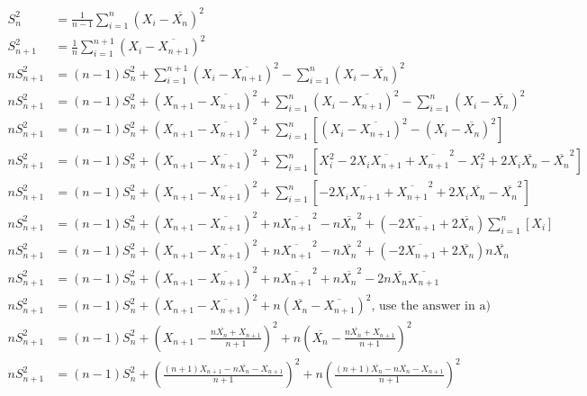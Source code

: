 \documentclass[11pt,letterpaper,titlepage]{article}
\begin{document}
\begin{enumerate}
\begin{enumerate}
        \begin{equation*}
            \begin{aligned}
                S_n^2 & = \frac{1}{n-1} \sum_{i=1}^{n} (X_i - \overline{X_n})^2 \\
                S_{n+1}^2 & = \frac{1}{n} \sum_{i=1}^{n+1} (X_i - \overline{X_{n+1}})^2 \\
                n S_{n+1}^2 &= (n - 1) S_n^2 + \sum_{i=1}^{n+1} (X_i - \overline{X_{n+1}})^2 - \sum_{i=1}^{n} (X_i - \overline{X_n})^2 \\
                n S_{n+1}^2 &= (n - 1) S_n^2 + (X_{n + 1} - \overline{X_{n+1}})^2 + \sum_{i=1}^{n} (X_i - \overline{X_{n+1}})^2 - \sum_{i=1}^{n} (X_i - \overline{X_n})^2 \\
                n S_{n+1}^2 &= (n - 1) S_n^2 + (X_{n + 1} - \overline{X_{n+1}})^2 + \sum_{i=1}^{n} [(X_i - \overline{X_{n+1}})^2 - (X_i - \overline{X_n})^2] \\
                n S_{n+1}^2 &= (n - 1) S_n^2 + (X_{n + 1} - \overline{X_{n+1}})^2 + \sum_{i=1}^{n} [X_i^2 - 2 X_i \overline{X_{n+1}} + \overline{X_{n+1}}^2 - X_i^2 + 2 X_i \overline{X_{n}} - \overline{X_{n}}^2] \\
                n S_{n+1}^2 &= (n - 1) S_n^2 + (X_{n + 1} - \overline{X_{n+1}})^2 + \sum_{i=1}^{n} [- 2 X_i \overline{X_{n+1}} + \overline{X_{n+1}}^2 + 2 X_i \overline{X_{n}} - \overline{X_{n}}^2] \\
                n S_{n+1}^2 &= (n - 1) S_n^2 + (X_{n + 1} - \overline{X_{n+1}})^2 + n \overline{X_{n+1}}^2 - n \overline{X_{n}}^2 + (- 2 \overline{X_{n+1}} + 2 \overline{X_{n}}) \sum_{i=1}^{n} [X_i ] \\
                n S_{n+1}^2 &= (n - 1) S_n^2 + (X_{n + 1} - \overline{X_{n+1}})^2 + n \overline{X_{n+1}}^2 - n \overline{X_{n}}^2 + (- 2 \overline{X_{n+1}} + 2 \overline{X_{n}}) n \overline{X_n} \\
                n S_{n+1}^2 &= (n - 1) S_n^2 + (X_{n + 1} - \overline{X_{n+1}})^2 + n \overline{X_{n+1}}^2 + n \overline{X_{n}}^2 - 2 n \overline{X_n} \overline{X_{n+1}} \\
                n S_{n+1}^2 &= (n - 1) S_n^2 + (X_{n + 1} - \overline{X_{n+1}})^2 + n (\overline{X_n} - \overline{X_{n+1}})^2 \text{, use the answer in a)}\\
                n S_{n+1}^2 &= (n - 1) S_n^2 + (X_{n + 1} - \frac{n \overline{X_n} + X_{n+1}}{n + 1})^2 + n (\overline{X_n} - \frac{n \overline{X_n} + X_{n+1}}{n + 1})^2 \\
                n S_{n+1}^2 &= (n - 1) S_n^2 + (\frac{(n + 1)X_{n+1} - n \overline{X_n} - X_{n+1}}{n+1})^2 + n (\frac{(n + 1) \overline{X_n} - n \overline{X_n} - X_{n+1}}{n+1})^2 \\

\end{aligned}
\end{equation*}
\end{enumerate}
\end{enumerate}
\end{document}
